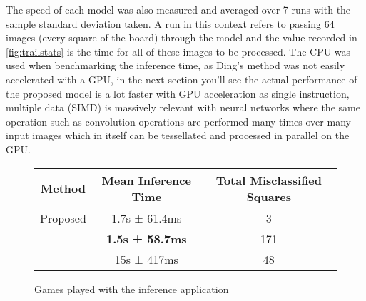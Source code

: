 The speed of each model was also measured and averaged over 7 runs with the sample standard deviation taken.  A run in this context refers to passing 64 images 
(every square of the board) through the model and the value recorded in \autoref{fig:trailstats} is the time for all of these images to be processed.
The CPU was used when benchmarking the inference time, as Ding's method was not easily accelerated with a GPU, in the next section you'll see the actual performance 
of the proposed model is a lot faster with GPU acceleration as single instruction, multiple data (SIMD) is massively relevant with neural networks where the same 
operation such as convolution operations are performed many times over many input images which in itself can be tessellated and processed in parallel on the GPU.

\begin{figure}[h]
    \centering
    \begin{tabular}{|c|c|c|}
        \hline
        Method & Mean Inference Time & Total Misclassified Squares \\
        \hline
        Proposed & 1.7s ± 61.4ms  & 3  \\
        \cite{chessvgg} & \textbf{1.5s ± 58.7ms} & 171 \\
        \cite{Ding2016ChessVisionC} & 15s ± 417ms & 48  \\
        \hline
    \end{tabular}
\caption{Games played with the inference application}
\label{fig:trailstats}
\end{figure}

